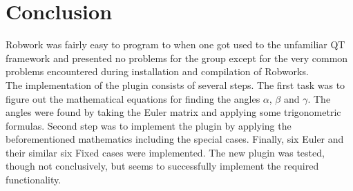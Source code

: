 \section{Conclusion}
Robwork was fairly easy to program to when one got used to the unfamiliar QT framework and presented no problems for the group except for the very common problems encountered during installation and compilation of Robworks.\\
The implementation of the plugin consists of several steps. The first task was to figure out the mathematical equations for finding the angles $\alpha$, $\beta$ and $\gamma$. The angles were found by taking the Euler matrix and applying some trigonometric formulas. Second step was to implement the plugin by applying the beforementioned mathematics including the special cases. Finally, six Euler and their similar six Fixed cases were implemented. The new plugin was tested, though not conclusively, but seems to successfully implement the required functionality.